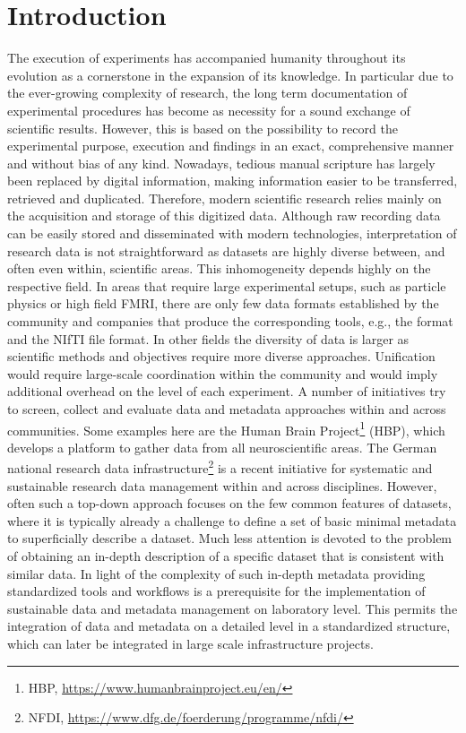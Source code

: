 \cleardoublepage
\chapter{Introduction}
\label{sec:intro}
The execution of experiments has accompanied humanity throughout its evolution as a cornerstone in the expansion of its knowledge. In particular due to the ever-growing complexity of research, the long term documentation of experimental procedures has become as necessity for a sound exchange of scientific results. However, this is based on the possibility to record the experimental purpose, execution and findings in an exact, comprehensive manner and without bias of any kind. Nowadays, tedious manual scripture has largely been replaced by digital information, making information easier to be transferred, retrieved and duplicated. Therefore, modern scientific research relies mainly on the acquisition and storage of this digitized data. Although raw recording data can be easily stored and disseminated with modern technologies, interpretation of research data is not straightforward as datasets are highly diverse between, and often even within, scientific areas. This inhomogeneity depends highly on the respective field. In areas that require large experimental setups, such as particle physics or high field FMRI, there are only few data formats established by the community and companies that produce the corresponding tools, e.g., the  format \citep{Brun_1996} and the NIfTI file format. In other fields the diversity of data is larger as scientific methods and objectives require more diverse approaches. Unification would require large-scale coordination within the community and  would imply additional overhead on the level of each experiment. A number of initiatives try to screen, collect and evaluate data and metadata approaches within and across communities. Some examples here are the Human Brain Project\footnote{HBP, \url{https://www.humanbrainproject.eu/en/}} (HBP), which develops a platform to gather data from all neuroscientific areas. The German national research data infrastructure\footnote{NFDI, \url{https://www.dfg.de/foerderung/programme/nfdi/}} is a recent initiative for systematic and sustainable research data management within and across disciplines. However, often such a top-down approach focuses on the few common features of datasets, where it is typically already a challenge to define a set of basic minimal metadata to superficially describe a dataset. Much less attention is devoted to the problem of obtaining an in-depth description of a specific dataset that is consistent with similar data. In light of the complexity of such in-depth metadata providing standardized tools and workflows is a prerequisite for the implementation of sustainable data and metadata management on laboratory level. This permits the integration of data and metadata on a detailed level in a standardized structure, which can later be integrated in large scale infrastructure projects.\\

